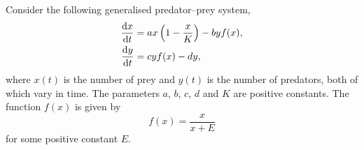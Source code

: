 \documentclass[a4paper, 12pt]{article}
\begin{document}
\begin{enumerate}[label={\bf \arabic{*}.\;}, ref={\arabic{*}},itemsep=3ex, left=0ex]

    {
      Consider the following generalised predator--prey system,
      \begin{align*}
        \fd{x}{t} &= ax\left(1-\frac{x}{K}\right) - byf(x), \\
        \fd{y}{t} &= cyf(x) - dy,
      \end{align*}
      where $x(t)$ is the number of prey and $y(t)$ is the number of predators, both of which vary in time. The parameters $a$, $b$, $c$, $d$ and $K$ are positive constants. The function $f(x)$ is given by
      \begin{equation*}
        f(x) = \frac{x}{x+E}
      \end{equation*}
      for some positive constant $E$.

}
\end{enumerate}
\end{document}
